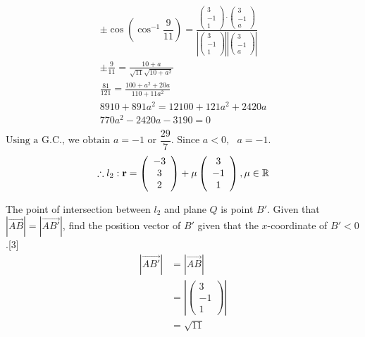 \documentclass[12pt, a4 paper]{article}
\begin{document}
\begin{outline}[enumerate]
					\color{blue}
					\[\begin{array}{l} \pm \cos \left( {{{\cos }^{ - 1}}\dfrac{9}{{11}}} \right) = \frac{{\left( {\begin{array}{*{20}{c}}3\\{ - 1}\\1\end{array}} \right) \cdot \left( {\begin{array}{*{20}{c}}3\\{ - 1}\\a\end{array}} \right)}}{{\left| {\left( {\begin{array}{*{20}{c}}3\\{ - 1}\\1\end{array}} \right)} \right|\left| {\left( {\begin{array}{*{20}{c}}3\\{ - 1}\\a\end{array}} \right)} \right|}}\\ \pm \frac{9}{{11}} = \frac{{10 + a}}{{\sqrt {11} \sqrt {10 + {a^2}} }}\\\frac{{81}}{{121}} = \frac{{100 + {a^2} + 20a}}{{110 + 11{a^2}}}\\8910 + 891{a^2} = 12100 + 121{a^2} + 2420a\\770{a^2} - 2420a - 3190 = 0\\\end{array}\]
					${\textrm{Using a G}}{\textrm{.C}}{\textrm{., we obtain }}a =  - 1{\textrm{ or }}\dfrac{{29}}{7}.{\textrm{ Since }}a < 0,{\textrm{ }}a =  - 1.$
					\[\therefore {l_2}:{\bf{r}} = \left( {\begin{array}{*{20}{c}}{ - 3}\\3\\2\end{array}} \right) + \mu \left( {\begin{array}{*{20}{c}}3\\{ - 1}\\1\end{array}} \right),\mu  \in \mathbb{R}\]
															
					\color{black}
															        
					\2 	The point of intersection between ${l_2}$ and plane $Q$ is point $B'$. Given that $\left| {\overrightarrow {AB} } \right| = \left| {\overrightarrow {AB'} } \right|$, find the position vector of $B'$ given that the $x$-coordinate of $B' < 0$.\hfill[3]
					\color{blue}
					\begin{align*}
						\left| {\overrightarrow {AB'} } \right| & = \left| {\overrightarrow {AB} } \right| \\ &= \left| {\left( {\begin{array}{*{20}{c}}3\\{ - 1}\\1\end{array}} \right)} \right|\\ &= \sqrt {11}
					\end{align*}
															

\end{outline}
\end{document}
